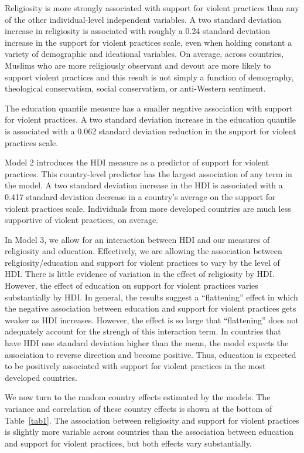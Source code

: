 \documentclass[10pt,letterpaper]{article}
\begin{document}
Religiosity is more strongly associated with support for violent
practices than any of the other individual-level independent variables.
A two standard deviation increase in religiosity is associated with
roughly a 0.24 standard deviation increase in the support for violent
practices scale, even when holding constant a variety of demographic and
ideational variables. On average, across countries, Muslims who are more
religiously observant and devout are more likely to support violent
practices and this result is not simply a function of demography,
theological conservatism, social conservatism, or anti-Western
sentiment.

The education quantile measure has a smaller negative association with
support for violent practices. A two standard deviation increase in the
education quantile is associated with a 0.062 standard deviation
reduction in the support for violent practices scale.

Model 2 introduces the HDI measure as a predictor of support for violent
practices. This country-level predictor has the largest association of
any term in the model. A two standard deviation increase in the HDI is
associated with a 0.417 standard deviation decrease in a country's
average on the support for violent practices scale. Individuals from
more developed countries are much less supportive of violent practices,
on average.

In Model 3, we allow for an interaction between HDI and our measures of
religiosity and education. Effectively, we are allowing the association
between religiosity/education and support for violent practices to vary
by the level of HDI. There is little evidence of variation in the effect
of religiosity by HDI. However, the effect of education on support for
violent practices varies substantially by HDI. In general, the results
suggest a ``flattening'' effect in which the negative association
between education and support for violent practices gets weaker as HDI
increases. However, the effect is so large that ``flattening'' does not
adequately account for the strengh of this interaction term. In
countries that have HDI one standard deviation higher than the mean, the
model expects the association to reverse direction and become positive.
Thus, education is expected to be positively associated with support for
violent practices in the most developed countries.

We now turn to the random country effects estimated by the models. The
variance and correlation of these country effects is shown at the bottom
of Table~\ref{tab1}. The association between religiosity and support for violent practices is slightly more variable across countries than the
association between education and support for violent practices, but
both effects vary substantially.
\end{document}
